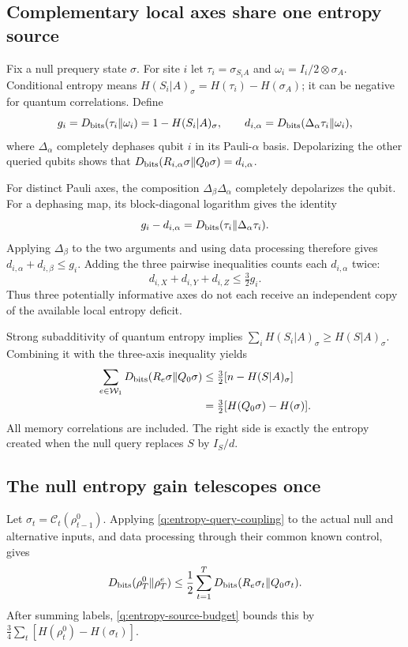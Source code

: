 \documentclass[11pt,a4paper]{article}
\numberwithin{equation}{section}
\theoremstyle{definition}
\theoremstyle{remark}
\begin{document}
\subsection{Complementary local axes share one entropy source}

Fix a null prequery state $\sigma$. For site $i$ let
$\tau_i=\sigma_{S_iA}$ and
$\omega_i=I_i/2\otimes\sigma_A$.
Conditional entropy means
$H(S_i|A)_\sigma=H(\tau_i)-H(\sigma_A)$; it can be negative for quantum
correlations. Define
\[
 g_i=D_{\rm bits}(\tau_i\Vert\omega_i)
       =1-H(S_i|A)_\sigma,\qquad
 d_{i,\alpha}=D_{\rm bits}(\Delta_\alpha\tau_i\Vert\omega_i),
\]
where $\Delta_\alpha$ completely dephases qubit $i$ in its Pauli-$\alpha$
basis. Depolarizing the other queried qubits shows that
$D_{\rm bits}(R_{i,\alpha}\sigma\Vert Q_0\sigma)=d_{i,\alpha}$.

For distinct Pauli axes, the composition
$\Delta_\beta\Delta_\alpha$ completely depolarizes the qubit.
For a dephasing map, its block-diagonal logarithm gives the identity
\[
 g_i-d_{i,\alpha}
   =D_{\rm bits}(\tau_i\Vert\Delta_\alpha\tau_i).
\]
Applying $\Delta_\beta$ to the two arguments and using data processing
therefore gives $d_{i,\alpha}+d_{i,\beta}\leq g_i$.
Adding the three pairwise inequalities counts each $d_{i,\alpha}$ twice:
\[
 d_{i,X}+d_{i,Y}+d_{i,Z}\leq\tfrac32g_i.
\]
Thus three potentially informative axes do not each receive an independent
copy of the available local entropy deficit.

Strong subadditivity of quantum entropy implies
$\sum_iH(S_i|A)_\sigma\geq H(S|A)_\sigma$.
Combining it with the three-axis inequality yields
\begin{align}
 \sum_{e\in\mathcal W_1}
 D_{\rm bits}(R_e\sigma\Vert Q_0\sigma)
 &\leq\tfrac32[n-H(S|A)_\sigma]\nonumber\\
 &=\tfrac32[H(Q_0\sigma)-H(\sigma)].
 \label{q:entropy-source-budget}
\end{align}
All memory correlations are included. The right side is exactly the entropy
created when the null query replaces $S$ by $I_S/d$.

\subsection{The null entropy gain telescopes once}

Let $\sigma_t=\mathcal C_t(\rho_{t-1}^0)$. Applying
\eqref{q:entropy-query-coupling} to the actual null and alternative inputs,
and data processing through their common known control, gives
\[
 D_{\rm bits}(\rho_T^0\Vert\rho_T^e)
 \leq\frac12\sum_{t=1}^T
 D_{\rm bits}(R_e\sigma_t\Vert Q_0\sigma_t).
\]
After summing labels, \eqref{q:entropy-source-budget} bounds this by
$\tfrac34\sum_t[H(\rho_t^0)-H(\sigma_t)]$.
\end{document}

